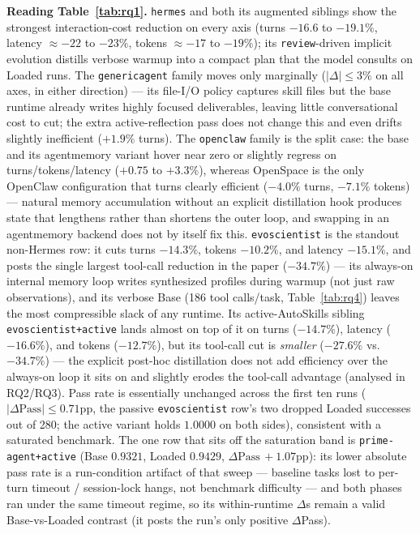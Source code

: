 \documentclass{article}
\begin{document}
\textbf{Reading Table~\ref{tab:rq1}.} \texttt{hermes} and both its augmented siblings show the strongest interaction-cost reduction on every axis (turns $-16.6$ to $-19.1\%$, latency $\approx-22$ to $-23\%$, tokens $\approx-17$ to $-19\%$); its \texttt{review}-driven implicit evolution distills verbose warmup into a compact plan that the model consults on Loaded runs. The \texttt{genericagent} family moves only marginally ($|\Delta|\le 3\%$ on all axes, in either direction) --- its file-I/O policy captures skill files but the base runtime already writes highly focused deliverables, leaving little conversational cost to cut; the extra active-reflection pass does not change this and even drifts slightly inefficient ($+1.9\%$ turns). The \texttt{openclaw} family is the split case: the base and its agentmemory variant hover near zero or slightly regress on turns/tokens/latency ($+0.75$ to $+3.3\%$), whereas OpenSpace is the only OpenClaw configuration that turns clearly efficient ($-4.0\%$ turns, $-7.1\%$ tokens) --- natural memory accumulation without an explicit distillation hook produces state that lengthens rather than shortens the outer loop, and swapping in an agentmemory backend does not by itself fix this. \texttt{evoscientist} is the standout non-Hermes row: it cuts turns $-14.3\%$, tokens $-10.2\%$, and latency $-15.1\%$, and posts the single largest tool-call reduction in the paper ($-34.7\%$) --- its always-on internal memory loop writes synthesized profiles during warmup (not just raw observations), and its verbose Base (186 tool calls/task, Table~\ref{tab:rq4}) leaves the most compressible slack of any runtime. Its active-AutoSkills sibling \texttt{evoscientist+active} lands almost on top of it on turns ($-14.7\%$), latency ($-16.6\%$), and tokens ($-12.7\%$), but its tool-call cut is \emph{smaller} ($-27.6\%$ vs.\ $-34.7\%$) --- the explicit post-hoc distillation does not add efficiency over the always-on loop it sits on and slightly erodes the tool-call advantage (analysed in RQ2/RQ3). Pass rate is essentially unchanged across the first ten runs ($|\Delta\text{Pass}| \le 0.71$pp, the passive \texttt{evoscientist} row's two dropped Loaded successes out of 280; the active variant holds $1.0000$ on both sides), consistent with a saturated benchmark. The one row that sits off the saturation band is \texttt{prime-agent+active} (Base $0.9321$, Loaded $0.9429$, $\Delta\text{Pass}\,{+}1.07$pp): its lower absolute pass rate is a run-condition artifact of that sweep --- baseline tasks lost to per-turn timeout / session-lock hangs, not benchmark difficulty --- and both phases ran under the same timeout regime, so its within-runtime $\Delta$s remain a valid Base-vs-Loaded contrast (it posts the run's only positive $\Delta$Pass).
\end{document}
